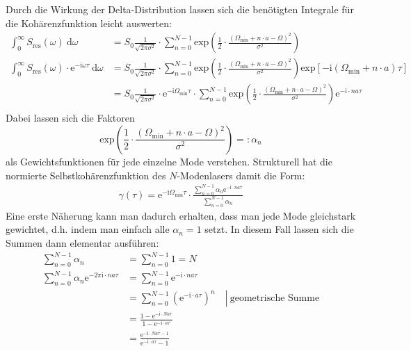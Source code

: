 \documentclass[german,  %
parskip=full,  %
]{scrartcl}
\begin{document}
Durch die Wirkung der Delta-Distribution lassen sich die benötigten Integrale für die Kohärenzfunktion leicht auswerten:
\begin{align*}
\int_{0}^{\infty} S_{\mathrm{res}}(\omega) \ \mathrm{d}\omega &= S_0 \frac{1}{\sqrt{2\pi\sigma^2}}\cdot\sum_{n = 0}^{N-1}\mathrm{exp}\left(\frac{1}{2}\cdot\frac{(\Omega_{\mathrm{min}} + n\cdot  a -\Omega)^2}{\sigma^2}\right)   \\
\int_{0}^{\infty} S_{\mathrm{res}}(\omega)\cdot\mathrm{e}^{-\mathrm{i}\omega\tau} \ \mathrm{d}\omega &= S_0 \frac{1}{\sqrt{2\pi\sigma^2}}\cdot\sum_{n = 0}^{N-1}\mathrm{exp}\left(\frac{1}{2}\cdot\frac{(\Omega_{\mathrm{min}} + n\cdot  a -\Omega)^2}{\sigma^2}\right) \mathrm{exp}\left[-\mathrm{i}(\Omega_{\mathrm{min}} + n\cdot  a)\tau\right] \\
&= S_0 \frac{1}{\sqrt{2\pi\sigma^2}} \cdot\mathrm{e}^{-\mathrm{i}\Omega_{\mathrm{min}}\tau}\cdot\sum_{n = 0}^{N-1}\mathrm{exp}\left(\frac{1}{2}\cdot\frac{(\Omega_{\mathrm{min}} + n\cdot  a -\Omega)^2}{\sigma^2}\right) \mathrm{e}^{-\mathrm{i}\cdot na\tau} \\
\end{align*}
Dabei lassen sich die Faktoren 
\[\mathrm{exp}\left(\frac{1}{2}\cdot\frac{(\Omega_{\mathrm{min}} + n\cdot  a -\Omega)^2}{\sigma^2}\right) =: \alpha_n\]
als Gewichtsfunktionen für jede einzelne Mode verstehen. Strukturell hat die normierte Selbstkohärenzfunktion des \(N\)-Modenlasers damit die Form:
\begin{align}
\gamma(\tau) = \mathrm{e}^{-\mathrm{i}\Omega_{\mathrm{min}}\tau} \cdot \frac{\sum_{n=0}^{N-1}\alpha_n\mathrm{e}^{-\mathrm{i}\cdot na\tau}}{\sum_{n=0}^{N-1}\alpha_n}
\end{align}
Eine erste Näherung kann man dadurch erhalten, dass man jede Mode gleichstark gewichtet, d.h. indem man einfach alle \(\alpha_n = 1\) setzt. In diesem Fall lassen sich die Summen dann elementar ausführen:
\begin{align*}
\sum_{n=0}^{N-1}\alpha_n &= \sum_{n=0}^{N-1}1 = N \\
\sum_{n=0}^{N-1}\alpha_n\mathrm{e}^{-2\pi\mathrm{i}\cdot na\tau} &= \sum_{n=0}^{N-1}\mathrm{e}^{-\mathrm{i}\cdot na\tau} \\
&= \sum_{n=0}^{N-1}\left(\mathrm{e}^{-\mathrm{i}\cdot a\tau}\right)^{n} \quad\left| \ \text{geometrische Summe}\right. \\
&= \frac{1-\mathrm{e}^{-\mathrm{i}\cdot Na\tau}}{1-\mathrm{e}^{-\mathrm{i}\cdot a\tau}} \\
&= \frac{\mathrm{e}^{-\mathrm{i}\cdot Na\tau - 1}}{\mathrm{e}^{-\mathrm{i}\cdot a\tau} - 1} 
\end{align*}
\end{document}
